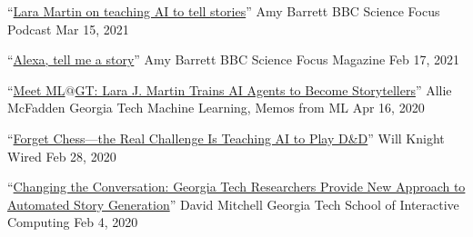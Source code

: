   \cvmedia
    {``\href{https://www.sciencefocus.com/future-technology/lara-martin-on-teaching-ai-to-tell-stories/}{Lara Martin on teaching AI to tell stories}''} %
    {Amy Barrett} %
    {BBC Science Focus Podcast} %
    {Mar 15, 2021} %

  \cvmedia
    {``\href{https://www.sciencefocus.com/magazine/dark-stars/}{Alexa, tell me a story}''} %
    {Amy Barrett} %
    {BBC Science Focus Magazine} %
    {Feb 17, 2021} %

  \cvmedia
    {``\href{https://web.archive.org/web/20230128071120/https://mlatgt.blog/2020/04/16/meet-mlgt-lara-j-martin-trains-ai-agents-to-become-storytellers/}{Meet ML$@$GT: Lara J. Martin Trains AI Agents to Become Storytellers}''} %
    {Allie McFadden} %
    {Georgia Tech Machine Learning, Memos from ML\@GT} %
    {Apr 16, 2020} %

  \cvmedia
    {``\href{https://www.wired.com/story/forget-chess-real-challenge-teaching-ai-play-dandd/}{Forget Chess---the Real Challenge Is Teaching AI to Play D\&D}''} %
    {Will Knight} %
    {Wired} %
    {Feb 28, 2020} %

  \cvmedia
    {``\href{https://www.gatech.edu/news/2020/02/04/changing-conversation-georgia-tech-researchers-provide-new-approach-automated-story}{Changing the Conversation: Georgia Tech Researchers Provide New Approach to Automated Story Generation}''} %
    {David Mitchell} %
    {Georgia Tech School of Interactive Computing} %
    {Feb 4, 2020} %




